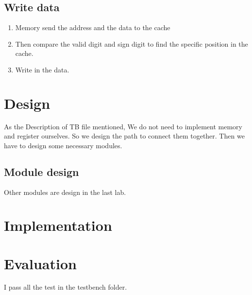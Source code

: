 \documentclass[12pt,a4paper]{article}
\begin{document}
\subsection{Write data}

\begin{enumerate}
\item Memory send the address and the data to the cache
\item Then compare the valid digit and sign digit to find the specific position in the cache.
\item Write in the data.

\end{enumerate}

\newpage

\section{Design}

As the Description of TB file mentioned, We do not need to implement memory and register ourselves.
So we design the path to connect them together.
Then we have to design some necessary modules.

\subsection{Module design}
\item Other modules are design in the last lab.

\newpage

\section{Implementation}


\newpage

\section{Evaluation}

I pass all the test in the testbench folder.
\end{document}
